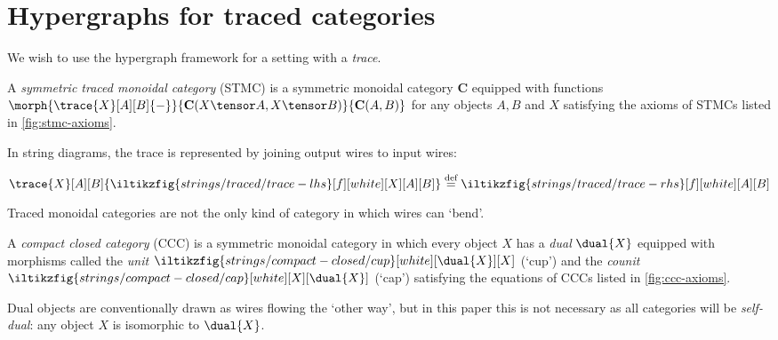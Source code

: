 \section{Hypergraphs for traced categories}

We wish to use the hypergraph framework for a setting with a \emph{trace}.

\begin{definition}
    A \emph{symmetric traced monoidal category} (STMC) is a symmetric monoidal
    category \(\mathbf{C}\) equipped with \iftoggle{conf}{a family of }{}
    functions \(
        \morph{
            \trace{X}[A][B]{-}
        }{
            \mathbf{C}(X \tensor A, X \tensor B)
        }{
            \mathbf{C}(A, B)
        }
    \) for any objects \(A,B\) and \(X\) satisfying the axioms of STMCs listed
    in \cref{fig:stmc-axioms}.
\end{definition}



In string diagrams, the trace is represented by joining output wires to input
wires:
%
\begin{center}
    \(
        \trace{X}[A][B]{\iltikzfig{strings/traced/trace-lhs}[f][white][X][A][B]}
        \stackrel{\text{def}}{=}
        \iltikzfig{strings/traced/trace-rhs}[f][white][A][B]
    \)
\end{center}

Traced monoidal categories are not the only kind of category in which wires can
`bend'.

\begin{definition}
    A \emph{compact closed category} (CCC) is a symmetric monoidal category in
    which every object \(X\) has a \emph{dual} \(\dual{X}\) equipped with
    morphisms called the \emph{unit} \(
        \iltikzfig{strings/compact-closed/cup}[white][\dual{X}][X]
    \) (`cup') and the \emph{counit} \(
        \iltikzfig{strings/compact-closed/cap}[white][X][\dual{X}]
    \) (`cap') satisfying the equations of CCCs listed in \cref{fig:ccc-axioms}.
\end{definition}



Dual objects are conventionally drawn as wires flowing the `other way', but in
this paper this is not necessary as all categories will be \emph{self-dual}: any
object \(X\) is isomorphic to \(\dual{X}\).

